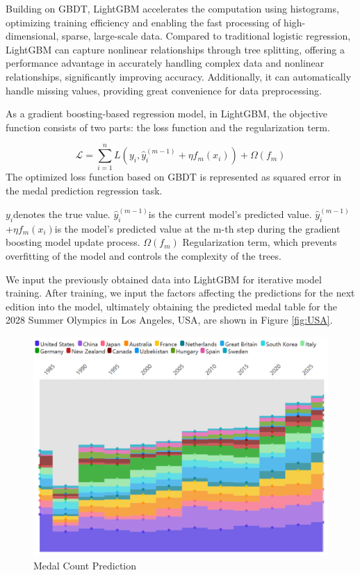 \documentclass[12pt]{article}  %
\begin{document}
Building on GBDT, LightGBM accelerates the computation using histograms, optimizing training efficiency and enabling the fast processing of high-dimensional, sparse, large-scale data. Compared to traditional logistic regression, LightGBM can capture nonlinear relationships through tree splitting, offering a performance advantage in accurately handling complex data and nonlinear relationships, significantly improving accuracy. Additionally, it can automatically handle missing values, providing great convenience for data preprocessing.

As a gradient boosting-based regression model, in LightGBM, the objective function consists of two parts: the loss function and the regularization term.

\begin{equation}
	\mathcal{L} = \sum_{i=1}^{n} L(y_i, \hat{y}_i^{(m-1)} + \eta f_m(x_i)) + \Omega(f_m)
\end{equation}
The optimized loss function based on GBDT is represented as squared error in the medal prediction regression task.

$y_i$denotes the true value.
$\hat{y}_i^{(m-1)}$is the current model's predicted value.
$\hat{y}_i^{(m-1)}$+$\eta f_m(x_i)$is the model's predicted value at the m-th step during the gradient boosting model update process.
$\Omega(f_m)$ Regularization term, which prevents overfitting of the model and controls the complexity of the trees.

We input the previously obtained data into LightGBM for iterative model training. After training, we input the factors affecting the predictions for the next edition into the model, ultimately obtaining the predicted medal table for the 2028 Summer Olympics in Los Angeles, USA, are shown in Figure \ref{fig:USA}.
\begin{figure}[htbp]
	\centering
	\includegraphics[width=12cm]{img/Predict.png}
	\caption{Medal Count Prediction}
	\label{fig:aa}
\end{figure}
\end{document}
